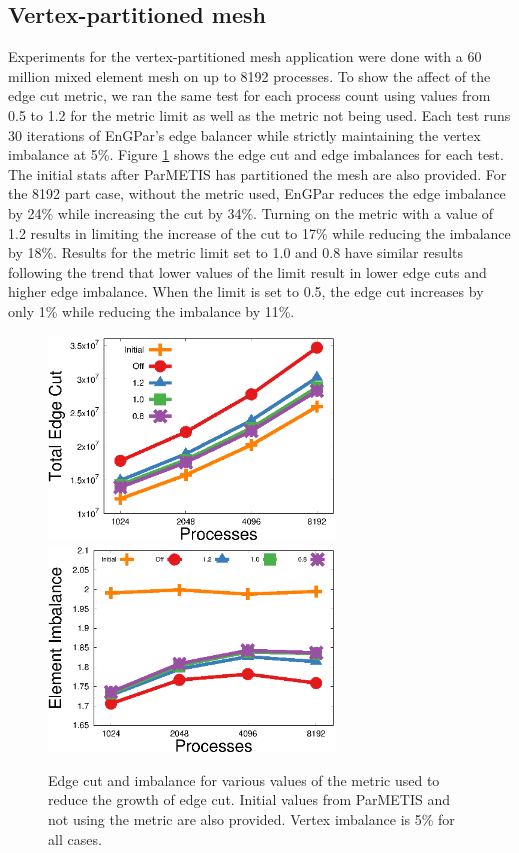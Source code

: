 \documentclass[conference]{IEEEtran}
\begin{document}
\subsection {Vertex-partitioned mesh}
Experiments for the vertex-partitioned mesh application were done with a 60 million
mixed element mesh on up to 8192 processes. To show the affect of the edge cut
metric, we ran the same test for each process count using values from 0.5 to 1.2
for the metric limit as well as the metric not being used. Each test runs 30 iterations
of EnGPar's edge balancer while strictly maintaining the vertex imbalance at 5\%.
Figure \ref{fig:metric} shows the edge cut and edge imbalances for each
test. The initial stats after ParMETIS has partitioned the mesh are also provided. For the
8192 part case, without
the metric used, EnGPar reduces the edge imbalance by 24\% while increasing the cut by
34\%. Turning on the metric with a value of 1.2 results in limiting the increase of the cut to
17\% while reducing the imbalance by 18\%. Results for the metric limit set to 1.0
and 0.8 have similar results following the trend that lower values of the limit result
in lower edge cuts and higher edge imbalance. When the limit is set to 0.5, the edge cut
increases by only 1\% while reducing the imbalance by 11\%.

\begin{figure}[!ht]
  \centering
  \includegraphics[width=3in]{plots/aepw_edgeCut_collapse_results/ecut_v_cores}
  \includegraphics[width=3in]{plots/aepw_edgeCut_collapse_results/eimb_v_cores}
  \caption{Edge cut and imbalance for various values of the metric used to reduce the growth of edge cut. Initial values from ParMETIS and not using the metric are also provided. Vertex imbalance is 5\% for all cases.}
  \label{fig:metric}
\end{figure}
\end{document}
